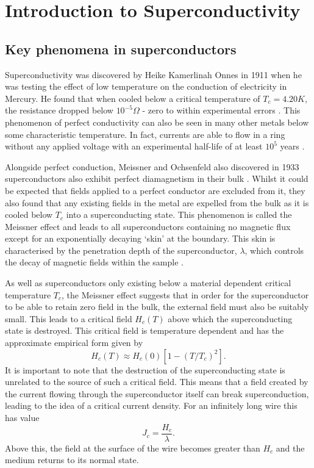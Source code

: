 \documentclass{article}
\numberwithin{equation}{section}
\begin{document}
\newpage
\section{Introduction to Superconductivity}
\subsection{Key phenomena in superconductors}
Superconductivity was discovered by Heike Kamerlinah Onnes in 1911 when he was testing the effect of low temperature on the conduction of electricity in Mercury. He found that when cooled below a critical temperature of $T_c = 4.20K$, the resistance dropped below $10^{-5}\Omega$ - zero to within experimental errors \cite{VanDelft2010TheSuperconductivity}. This phenomenon of perfect conductivity can also be seen in many other metals below some characteristic temperature. In fact, currents are able to flow in a ring without any applied voltage with an experimental half-life of at least $10^5$ years \cite{Tinkham2004IntroductionSuperconductivity}.

Alongside perfect conduction, Meissner and Ochsenfeld also discovered in 1933 superconductors also exhibit perfect diamagnetism in their bulk \cite{Poole2014Superconductivity}. Whilst it could be expected that fields applied to a perfect conductor are excluded from it, they also found that any existing fields in the metal are expelled from the bulk as it is cooled below $T_c$ into a superconducting state. This phenomenon is called the Meissner effect and leads to all superconductors containing no magnetic flux except for an exponentially decaying `skin' at the boundary. This skin is characterised by the penetration depth of the superconductor, $\lambda$, which controls the decay of magnetic fields within the sample \cite{Tinkham2004IntroductionSuperconductivity}.

As well as superconductors only existing below a material dependent critical temperature $T_c$, the Meissner effect suggests that in order for the superconductor to be able to retain zero field in the bulk, the external field must also be suitably small. This leads to a critical field $H_c(T)$ above which the superconducting state is destroyed. This critical field is temperature dependent and has the approximate empirical form given by \cite{Tinkham2004IntroductionSuperconductivity}
\begin{equation}
    H_c(T) \approx H_c(0)[1 - (T/T_c)^2].
\end{equation}
It is important to note that the destruction of the superconducting state is unrelated to the source of such a critical field. This means that a field created by the current flowing through the superconductor itself can break superconduction, leading to the idea of a critical current density. For an infinitely long wire this has value \cite{Tinkham2004IntroductionSuperconductivity}
\begin{equation}
    J_c = \frac{H_c}{\lambda}.
\end{equation}
Above this, the field at the surface of the wire becomes greater than $H_c$ and the medium returns to its normal state.
\end{document}

